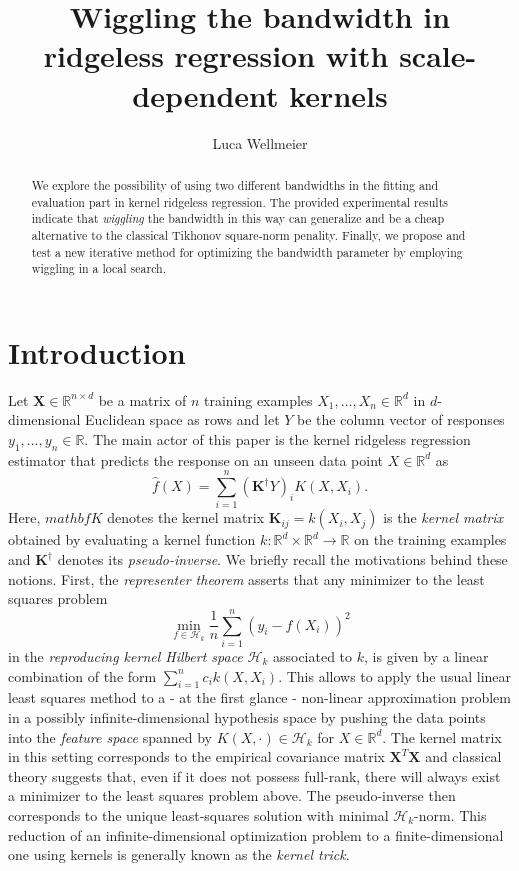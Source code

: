 \documentclass[12pt]{amsart}
\title{Wiggling the bandwidth in ridgeless regression 
    with scale-dependent kernels}
\author{Luca Wellmeier}
\newcommand{\R}{\mathbb{R}}
\begin{document}
\begin{abstract}
    We explore the possibility of using two different bandwidths in the 
    fitting and evaluation part in kernel ridgeless regression.
    The provided experimental results indicate that \textit{wiggling}
    the bandwidth in this way can generalize and be a cheap alternative to
    the classical Tikhonov square-norm penality.
    Finally, we propose and test a new iterative method for optimizing the 
    bandwidth parameter by employing wiggling in a local search.
\end{abstract}
\maketitle
\tableofcontents

\section{Introduction}

Let $\mathbf X \in \R^{n \times d}$ be a matrix of $n$ training examples
$X_1, \dots, X_n \in \R^d$ in $d$-dimensional Euclidean space as rows and 
let $Y$ be the column vector of responses $y_1, \dots, y_n \in \R$.
The main actor of this paper is the kernel ridgeless regression estimator
that predicts the response on an unseen data point $X \in \R^d$ as
\begin{equation} \label{eq:ridgeless}
    \hat f(X) = \sum_{i=1}^n (\mathbf K^\dagger Y)_i K(X, X_i).
\end{equation}
Here, $mathbf K$ denotes the kernel matrix $\mathbf K_{ij} = k(X_i, X_j)$
is the \emph{kernel matrix} obtained by evaluating a kernel function 
$k \colon \R^d \times \R^d \to \R$ on the training examples and 
$\mathbf K^\dagger$ denotes its \emph{pseudo-inverse}.
We briefly recall the motivations behind these notions.
First, the \emph{representer theorem} asserts that any minimizer to the 
least squares problem
\[ \min_{f \in \mathcal H_k} \frac 1n \sum_{i=1}^n (y_i - f(X_i))^2 \]
in the \emph{reproducing kernel Hilbert space} $\mathcal H_k$ associated
to $k$, is given by a linear combination of the form
$\sum_{i=1}^n c_i k(X,X_i)$.
This allows to apply the usual linear least squares method to a - at the 
first glance - non-linear approximation problem in a possibly 
infinite-dimensional hypothesis space by pushing the data points into 
the \emph{feature space} spanned by $K(X, \cdot) \in \mathcal H_k$ 
for $X \in \R^d$.
The kernel matrix in this setting corresponds to the empirical covariance
matrix $\mathbf X^T \mathbf X$ and classical theory suggests that, even if 
it does not possess full-rank, there will always exist a minimizer to 
the least squares problem above.
The pseudo-inverse then corresponds to the unique least-squares solution
with minimal $\mathcal H_k$-norm.
This reduction of an infinite-dimensional optimization problem to a
finite-dimensional one using kernels is generally known as the 
\emph{kernel trick}.
\end{document}
